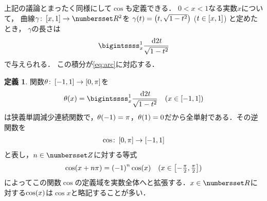 \documentclass[11pt,a4paper]{ltjsarticle}
\newcommand*{\coord}[1]{\paren{#1}}
\newcommand*{\maparrow}{\rightarrow}
\newcommand*{\intd}{\dl2}
\theoremstyle{definition}
\newtheorem{dfn}{定義}[section]
\begin{document}
上記の議論とまったく同様にして$\cos$も定義できる．
$0 < x < 1$なる実数$x$について，
曲線$\gamma \colon \interval{c}{x,1} \maparrow \Real^2$を
$\apply{\gamma}{t} = \coord{t, \sqrt{1 - t^2}}$ ($t \in \interval{c}{x,1}$)
と定めたとき，
$\gamma$の長さは
\begin{align}
  \bigintssss_x^1 \frac{\intd t}{\sqrt{1 - t^2}}
  \label{eq:arcx}
\end{align}
で与えられる．
この積分が\cref{eq:arc}に対応する．

\begin{dfn} \label{dfn:cos}
  関数$\theta \colon \interval{c}{-1, 1} \maparrow \interval{c}{0,\pi}$を
  \begin{align}
    \apply{\theta}{x} = \bigintssss_x^1 \frac{\intd t}{\sqrt{1 - t^2}} \quad \text{($x \in \interval{c}{-1,1}$)}
    \label{eq:arcx}
  \end{align}
  は狭義単調減少連続関数で，$\apply{\theta}{-1} = \pi$，$\apply{\theta}{1} = 0$だから全単射である．その逆関数を
  \begin{align}
    \cos \colon \interval{c}{0, \pi} \maparrow \interval{c}{-1,1}
    \label{eq:cos}
  \end{align}
  と表し，$n \in \Zahlen$に対する等式
  \begin{align}
    \apply{\cos}{x + n \pi} = \paren{-1}^n \apply{\cos}{x} \quad \text{($\textstyle x \in \interval{c}{-\frac{\pi}{2}, \frac{\pi}{2}}$)}
    \label{eq:cosperiod}
  \end{align}
  によってこの関数$\cos$の定義域を実数全体へと拡張する．$x \in \Real$に対する$\apply{\cos}{x}$は$\cos x$と略記することが多い．
\end{dfn}
\end{document}
